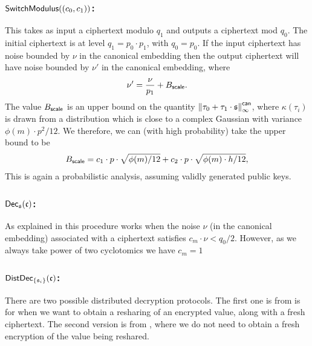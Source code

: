 \subsubsection{$\mathsf{SwitchModulus}((c_0,c_1))$:}
This takes as input a ciphertext modulo $q_1$ and outputs a ciphertext mod $q_0$.
The initial ciphertext is at level $q_1=p_0 \cdot p_1$, with $q_0=p_0$.
If the input ciphertext has noise bounded by $\nu$
in the canonical embedding
then the output ciphertext will have noise bounded by $\nu'$ in
the canonical embedding, where
\[ \nu' = \frac{\nu}{p_1} + B_{\mathsf{scale}}. \]
The value $B_{\mathsf{scale}}$ is an upper bound on the quantity
${\Vert \tau_0+\tau_1 \cdot \mathfrak{s} \Vert}_\infty^{\mathsf{can}}$, where
$\kappa(\tau_i)$ is drawn from a distribution
which is close to a complex Gaussian with variance $\phi(m)\cdot p^2/12$.
We therefore, we can (with high probability) take the upper
bound to be
\begin{align*}
    B_{\mathsf{scale}} 
	&= c_1 \cdot p \cdot \sqrt{ \phi(m)/12}
	+  c_2 \cdot p \cdot \sqrt{ \phi(m) \cdot h/12}, \\
\end{align*}
This is again a probabilistic analysis, assuming validly generated
public keys.

\subsubsection{$\mathsf{Dec}_{\mathfrak{s}}(\mathfrak{c})$:}
As explained in \cite{SPDZ2,GHS12c} this procedure works when the noise 
$\nu$ (in the canonical embedding) associated with a ciphertext satisfies $c_m \cdot \nu  < q_{0}/2$.
However, as we always take power of two cyclotomics we have $c_m=1$

\subsubsection{$\mathsf{DistDec}_{\{\mathfrak{s}_i\}}(\mathfrak{c})$:}
There are two possible distributed decryption protocols.
The first one is from \cite{SPDZ} is for when we want to obtain a
resharing of an encrypted value, along with a fresh ciphertext.
The second version is from \cite{KPR}, where we do not need to
obtain a fresh encryption of the value being reshared.


